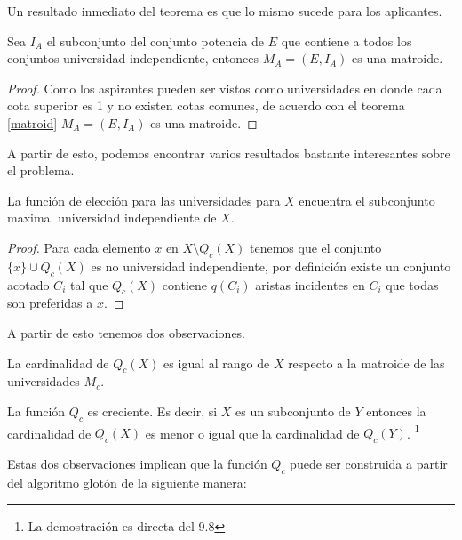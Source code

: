Un resultado inmediato del teorema es que lo mismo sucede para los aplicantes. 

\begin{cor}
Sea $I_A$ el subconjunto del conjunto potencia de $E$ que contiene a todos los conjuntos universidad independiente, entonces $M_A = (E,I_A)$ es una matroide. 
\end{cor}
\begin{proof}
Como los aspirantes pueden ser vistos como universidades en donde cada cota superior es 1 y no existen cotas comunes, de acuerdo con el teorema \ref{matroid} $M_A = (E,I_A)$ es una matroide. 
\end{proof}

A partir de esto, podemos encontrar varios resultados bastante interesantes sobre el problema. 

\begin{cor}
La función de elección para las universidades para $X$ encuentra el subconjunto maximal universidad independiente de $X$.
\end{cor}

\begin{proof}
Para cada elemento $x$ en $X\setminus Q_c(X)$ tenemos que el conjunto $\{x\}\cup Q_c(X)$ es no universidad independiente, por definición existe un conjunto acotado $C_i$ tal que $Q_c(X)$ contiene $q(C_i)$ aristas incidentes en $C_i$ que todas son preferidas a $x$.
\end{proof}

A partir de esto tenemos dos observaciones.

\begin{obs}
La cardinalidad de $Q_c(X)$ es igual al rango de $X$ respecto a la matroide de las universidades $M_c$. 
\end{obs}

\begin{obs}
La función $Q_c$ es creciente. Es decir, si $X$ es un subconjunto de $Y$ entonces la cardinalidad de $Q_c(X)$ es menor o igual que la cardinalidad de $Q_c(Y)$. \footnote{La demostración es directa del 9.8 } %
\end{obs} 

Estas dos observaciones implican que la función $Q_c$ puede ser construida a partir del algoritmo glotón de la siguiente manera:

